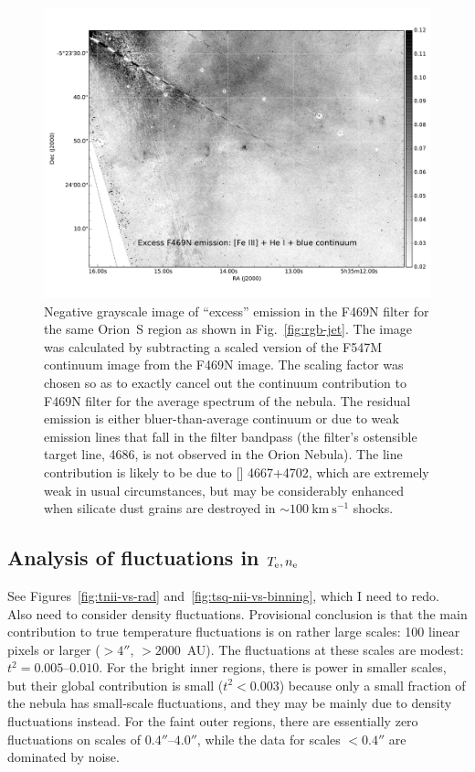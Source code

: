 \documentclass[preprint]{aastex}
\begin{document}
\begin{figure}
  \centering
  \includegraphics[width=\linewidth]{jet_region_excess-feiii}
  \caption{Negative grayscale image of ``excess'' emission in the
    F469N filter for the same Orion~S region as shown in
    Fig.~\ref{fig:rgb-jet}.  The image was calculated by subtracting a
    scaled version of the F547M continuum image from the F469N image.
    The scaling factor was chosen so as to exactly cancel out the
    continuum contribution to F469N filter for the average spectrum of
    the nebula.  The residual emission is either bluer-than-average
    continuum or due to weak emission lines that fall in the filter
    bandpass (the filter's ostensible target line,  4686,
    is not observed in the Orion Nebula).  The line contribution is
    likely to be due to [] 4667+4702, which are extremely
    weak in usual circumstances, but may be considerably enhanced when
    silicate dust grains are destroyed in \(\sim 100~\mathrm{km\
      s^{-1}}\) shocks.}
  \label{fig:feiii-excess-jet}
\end{figure}


\subsection{\boldmath Analysis of fluctuations in \(T_{\mathrm{e}}, n_{\mathrm{e}}\)}
\label{sec:fluct}

See Figures~\ref{fig:tnii-vs-rad} and~\ref{fig:tsq-nii-vs-binning},
which I need to redo.  Also need to consider density fluctuations.
Provisional conclusion is that the main contribution to true
temperature fluctuations is on rather large scales: 100 linear pixels
or larger (\(> 4''\), \(> 2000\)~AU).  The fluctuations at these
scales are modest: \(t^2 = 0.005\)--\(0.010\).  For the bright inner
regions, there is power in smaller scales, but their global
contribution is small (\(t^2 < 0.003\)) because only a small fraction
of the nebula has small-scale fluctuations, and they may be mainly due
to density fluctuations instead.  For the faint outer regions, there
are essentially zero fluctuations on scales of \(0.4''\)--\(4.0''\),
while the data for scales \(< 0.4''\) are dominated by noise.
\end{document}
